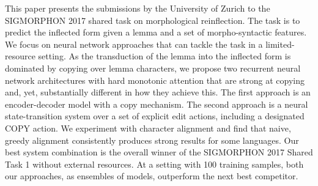 This paper presents the submissions by the University of Zurich to the SIGMORPHON 2017 shared task on morphological reinflection. The task is to predict the inflected form given a lemma and a set of morpho-syntactic features. We focus on neural network approaches that can tackle the task in a limited-resource setting. As the transduction of the lemma into the inflected form is dominated by copying over lemma characters, we propose two recurrent neural network architectures with hard monotonic attention that are strong at copying and, yet, substantially different in how they achieve this. The first approach is an encoder-decoder model with a copy mechanism. The second approach is a neural state-transition system over a set of explicit edit actions, including a designated COPY action. We experiment with character alignment and find that naive, greedy alignment consistently produces strong results for some languages. Our best system combination is the overall winner of the SIGMORPHON 2017 Shared Task 1 without external resources. At a setting with 100 training samples, both our approaches, as ensembles of models, outperform the next best competitor.
